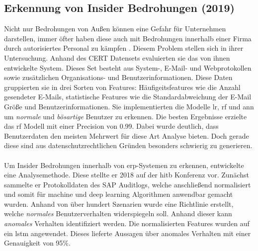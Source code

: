\documentclass[
    12pt, %
    DIV10,
    ngerman, %
    a4paper, %
    oneside, %
    titlepage, %
    parskip=half, %
    headings=normal, %
    listof=totoc, %
    bibliography=totoc, %
    index=totoc, %
    captions=tableheading, %
    final %
]{scrreprt}
\begin{document}
\subsection{Erkennung von Insider Bedrohungen (2019)}\label{cert}
Nicht nur Bedrohungen von Außen können eine Gefahr für Unternehmen darstellen, immer öfter haben diese auch mit Bedrohungen innerhalb einer Firma durch autorisiertes Personal zu kämpfen \parencite{Partners}. Diesem Problem stellen sich \textcite{Le2019} in ihrer Untersuchung. Anhand des CERT Datensets \parencite{glasser2013bridging} evaluierten sie das von ihnen entwickelte System. Dieses Set besteht aus System-, E-Mail- und Webprotokollen sowie zusätzlichen Organisations- und Benutzerinformationen. Diese Daten gruppierten sie in drei Sorten von Features: Häufigeitsfeatures wie die Anzahl gesendeter E-Mails, statistische Features wie die Standardabweichung der E-Mail Größe und Benutzerinformationen. Sie implementierten die Modelle \ac{lr}, \ac{rf} und \ac{ann} um \emph{normale} und \emph{bösartige} Benutzer zu erkennen. Die besten Ergebnisse erzielte das \ac{rf} Modell mit einer Precision von 0.99. Dabei wurde deutlich, dass Benutzerdaten den meisten Mehrwert für diese Art Analyse bieten. Doch gerade diese sind aus datenschutzrechtlichen Gründen besonders schwierig zu generieren. 
\\\\
Um Insider Bedrohungen innerhalb von \ac{erp}-Systemen zu erkennen, entwickelte \textcite{Neyolov} eine Analysemethode. Diese stellte er 2018 auf der \ac{hitb} Konferenz vor. Zunächst sammelte er Protokolldaten des SAP Auditlogs, welche anschließend normalisiert und somit für machine und deep learning Algorithmen anwendbar gemacht wurden. Anhand von über hundert Szenarien wurde eine Richtlinie erstellt, welche \emph{normales} Benutzerverhalten widerspiegeln soll. Anhand dieser kann \emph{anomales} Verhalten identifiziert werden. Die normalisierten Features wurden auf ein \ac{lstm} angewendet. Dieses lieferte Aussagen über anomales Verhalten mit einer Genauigkeit von 95\%.
\end{document}
